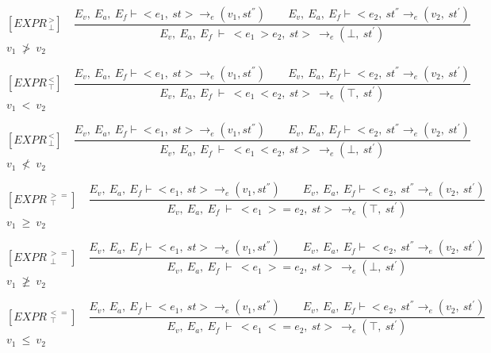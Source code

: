    	\newcommand{\exprtrans}[5][E_v, E_a,E_f]{#1\vdash \langle #2, #3 \rangle \mathrel{\to_e} (#4 , #5)}
   	
   	\[
   	[EXPR^{\ >}_{\ \bot}] \quad
   	\dfrac{E_v, \ E_a, \ E_f \vdash <e_1, \ st> \rightarrow_e (v_1, st^{''}) \qquad E_v, \ E_a, \ E_f \vdash <e_2, \ st^{''} \rightarrow_e (v_2, \ st^{'})}{E_v, \ E_a, \ E_f \ \vdash \ <e_1 \ > e_2, \ st> \ \rightarrow_e (\bot, \ st^{'})}
   	\]
	\begin{math}
   	v_1 \ \not> \ v_2
   	\end{math}   
   	
   	\[
   	[EXPR^{\ <}_{\ \top}] \quad
   	\dfrac{E_v, \ E_a, \ E_f \vdash <e_1, \ st> \rightarrow_e (v_1, st^{''}) \qquad E_v, \ E_a, \ E_f \vdash <e_2, \ st^{''} \rightarrow_e (v_2, \ st^{'})}{E_v, \ E_a, \ E_f \ \vdash \ <e_1 \ < e_2, \ st> \ \rightarrow_e (\top, \ st^{'})}
   	\]
	\begin{math}
   	v_1 \ < \ v_2
   	\end{math}   	
   	

   	\[
   	[EXPR^{\ <}_{\ \bot}] \quad
   	\dfrac{E_v, \ E_a, \ E_f \vdash <e_1, \ st> \rightarrow_e (v_1, st^{''}) \qquad E_v, \ E_a, \ E_f \vdash <e_2, \ st^{''} \rightarrow_e (v_2, \ st^{'})}{E_v, \ E_a, \ E_f \ \vdash \ <e_1 \ < e_2, \ st> \ \rightarrow_e (\bot, \ st^{'})}
   	\]
	\begin{math}
   	v_1 \ \not< \ v_2
   	\end{math}
   	
   	\[
   	[EXPR^{\ >=}_{\ \ \top}] \quad
   	\dfrac{E_v, \ E_a, \ E_f \vdash <e_1, \ st> \rightarrow_e (v_1, st^{''}) \qquad E_v, \ E_a, \ E_f \vdash <e_2, \ st^{''} \rightarrow_e (v_2, \ st^{'})}{E_v, \ E_a, \ E_f \ \vdash \ <e_1 \ >= e_2, \ st> \ \rightarrow_e (\top, \ st^{'})}
   	\]
	\begin{math}
   	v_1 \ \ge \ v_2
   	\end{math}   	
   	

   	\[
   	[EXPR^{\ >=}_{\ \ \bot}] \quad
   	\dfrac{E_v, \ E_a, \ E_f \vdash <e_1, \ st> \rightarrow_e (v_1, st^{''}) \qquad E_v, \ E_a, \ E_f \vdash <e_2, \ st^{''} \rightarrow_e (v_2, \ st^{'})}{E_v, \ E_a, \ E_f \ \vdash \ <e_1 \ >= e_2, \ st> \ \rightarrow_e (\bot, \ st^{'})}
   	\]
	\begin{math}
   	v_1 \ \ngeq \ v_2
   	\end{math}
   	
   	\[
   	[EXPR^{\ <=}_{\ \ \top}] \quad
   	\dfrac{E_v, \ E_a, \ E_f \vdash <e_1, \ st> \rightarrow_e (v_1, st^{''}) \qquad E_v, \ E_a, \ E_f \vdash <e_2, \ st^{''} \rightarrow_e (v_2, \ st^{'})}{E_v, \ E_a, \ E_f \ \vdash \ <e_1 \ <= e_2, \ st> \ \rightarrow_e (\top, \ st^{'})}
   	\]
	\begin{math}
   	v_1 \ \le \ v_2
   	\end{math}   	
   	

